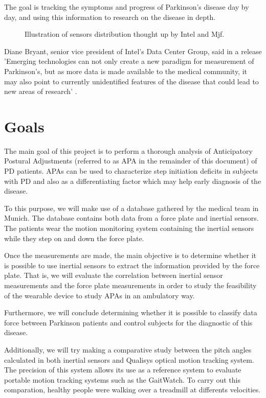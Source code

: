 The goal is tracking the  symptoms and progress of Parkinson’s disease day by day, and using this information to research on the disease in depth.

\begin{figure}[H]
	\centering
	\caption{Illustration of sensors distribution thought up by Intel and Mjf\cite{IntelAndMjf}.}
	\label{fig:IntelAndMjf}
\end{figure}

Diane Bryant, senior vice president of Intel's Data Center Group, said in a release \cite{IntelAndMjf}
'Emerging technologies can not only create a new paradigm for measurement of Parkinson's, but as more data is made available to the medical community, it may also point to currently unidentified features of the disease that could lead to new areas of research' .

\section{Goals}

The main goal of this project is to perform a thorough analysis of Anticipatory Postural Adjustments (referred to as APA in the remainder of this document) of PD patients. APAs can be used to characterize step initiation deficits in subjects with PD and also as a differentiating factor which may help early diagnosis of the disease.

To this purpose, we will make use of a database gathered by the medical team in Munich. The database contains both data from a force plate and inertial sensors. The patients wear the motion monitoring system containing the inertial sensors while they step on and down the force plate.

Once the measurements are made, the main objective is to determine whether it is possible to use inertial sensors to extract the information provided by the force plate. That is, we will evaluate the correlation between inertial sensor measurements and the force plate measurements in order to study the feasibility of the wearable device to study APAs in an ambulatory way. 

Furthermore, we will conclude determining whether it is possible to classify data force between Parkinson patients and control subjects for the diagnostic of this disease.

Additionally, we will try making a comparative study between the pitch angles calculated in both inertial sensors and Qualisys optical motion tracking system. The precision of this system allows its use as a reference system to evaluate portable
motion tracking systems such as the GaitWatch. To carry out this comparation, healthy people were walking over a treadmill at differents velocities.

